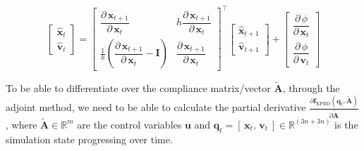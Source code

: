 \documentclass{article}
\newcommand{\pd}[2]{\dfrac{\partial\, #1}{\partial\, #2}}
\newcommand{\pdc}[2]{\frac{\partial #1}{\partial #2}}
\begin{document}
\begin{equation}
\begin{bmatrix}
    \displaystyle \hat{\mathbf{x}}_t \\[2ex]
    \displaystyle \hat{\mathbf{v}}_t
\end{bmatrix} 
= 
\begin{bmatrix}
    \displaystyle \pd{\mathbf{x}_{t+1}}{\mathbf{x}_{t}} & 
    \displaystyle h\pd{\mathbf{x}_{t+1}}{\mathbf{x}_{t}} \\[2ex]
    \displaystyle \frac{1}{h}\left(\pd{\mathbf{x}_{t+1}}{\mathbf{x}_{t}} - \mathbf{I}\right) & 
    \displaystyle \pd{\mathbf{x}_{t+1}}{\mathbf{x}_{t}}
\end{bmatrix}^\top 
\begin{bmatrix}
    \displaystyle \hat{\mathbf{x}}_{t+1} \\[2ex]
    \displaystyle \hat{\mathbf{v}}_{t+1}
\end{bmatrix} + 
\begin{bmatrix}
    \displaystyle \pd{\phi}{\mathbf{x}_{t}} \\[2ex]
    \displaystyle \pd{\phi}{\mathbf{v}_{t}}
\end{bmatrix}
\end{equation}

To be able to differentiate over the compliance matrix/vector $\tilde{\mathbf{A}}$, through the adjoint method, we need to be able to calculate the partial derivative $\pdc{\mathbf{f}_{\text{XPBD}}(\mathbf{q}_t, \tilde{\mathbf{A}})}{\tilde{\mathbf{A}}}$, where $\tilde{\mathbf{A}} \in \mathbb{R}^{m}$ are the control variables $\mathbf{u}$ and $\mathbf{q}_t = [\,\mathbf{x}_t,\, \mathbf{v}_t\,] \in \mathbb{R}^{(3n + 3n)}$ is the simulation state progressing over time.
\end{document}
